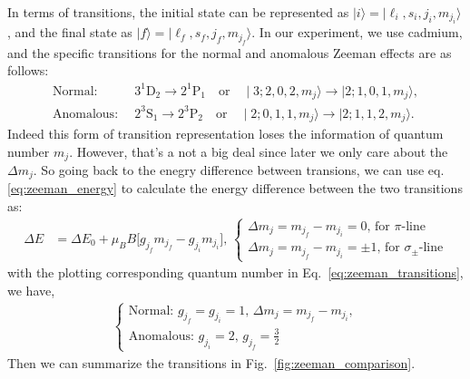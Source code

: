 \documentclass[a4paper,12pt]{article}
\begin{document}
In terms of transitions, the initial state can be represented as $\mid i \rangle = \mid \ell_i, s_i, j_i, m_{j_i} \rangle$, and the final state as $\mid f \rangle = \mid \ell_f, s_f, j_f, m_{j_f} \rangle$. In our experiment, we use cadmium, and the specific transitions for the normal and anomalous Zeeman effects are as follows:
\begin{align}
    \text{Normal: } & \, 3^1\mathrm{D_2} \to 2^1\mathrm{P_1} \quad \text{or} \quad \mid 3; 2, 0, 2, m_j \rangle \to \mid 2; 1, 0, 1, m_j \rangle, \\
    \text{Anomalous: } & \, 2^3\mathrm{S_1} \to 2^3\mathrm{P_2} \quad \text{or} \quad \mid 2; 0, 1, 1, m_j \rangle \to \mid 2; 1, 1, 2, m_j \rangle.
    \label{eq:zeeman_transitions}
\end{align}
Indeed this form of transition representation loses the information of quantum number $m_j$. However, that's a not a big deal since later we only care about the $\Delta m_j$. So going back to the enegry difference between transions, we can use eq.\ref{eq:zeeman_energy} to calculate the energy difference between the two transitions as:
\begin{align}
    \Delta E &= \Delta E_0 + \mu_B B \biggl[ g_{j_f} m_{j_f} - g_{j_i} m_{j_i} \biggr], \,
    \begin{cases}
        \Delta m_{j} = m_{j_f} - m_{j_i} = 0, \, \text{for } \pi \text{-line} \\
        \Delta m_{j} = m_{j_f} - m_{j_i} = \pm 1, \, \text{for } \sigma_{\pm} \text{-line}
    \end{cases}
\end{align}
with the plotting corresponding quantum number in Eq.~\ref{eq:zeeman_transitions}, we have,
\begin{align}
    \begin{cases} 
        \text{Normal: } g_{j_f} = g_{j_i} = 1, \, \Delta m_j = m_{j_f} - m_{j_i}, \\
        \text{Anomalous: } g_{j_i} = 2, \, g_{j_f} = \frac{3}{2}
    \end{cases}
\end{align}
\indent Then we can summarize the transitions in Fig.~\ref{fig:zeeman_comparison}.
\end{document}
